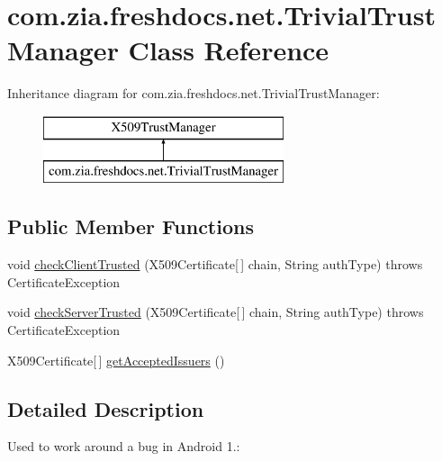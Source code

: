 \hypertarget{classcom_1_1zia_1_1freshdocs_1_1net_1_1_trivial_trust_manager}{\section{com.\-zia.\-freshdocs.\-net.\-Trivial\-Trust\-Manager Class Reference}
\label{classcom_1_1zia_1_1freshdocs_1_1net_1_1_trivial_trust_manager}
}
Inheritance diagram for com.\-zia.\-freshdocs.\-net.\-Trivial\-Trust\-Manager\-:\begin{figure}[H]
\begin{center}
\leavevmode
\includegraphics[height=2.000000cm]{classcom_1_1zia_1_1freshdocs_1_1net_1_1_trivial_trust_manager}
\end{center}
\end{figure}
\subsection*{Public Member Functions}
\begin{DoxyCompactItemize}
\item 
void \hyperlink{classcom_1_1zia_1_1freshdocs_1_1net_1_1_trivial_trust_manager_a2d78ff53750eb65a461cbd2ddb0da0dd}{check\-Client\-Trusted} (X509\-Certificate\mbox{[}$\,$\mbox{]} chain, String auth\-Type)  throws Certificate\-Exception 	
\item 
void \hyperlink{classcom_1_1zia_1_1freshdocs_1_1net_1_1_trivial_trust_manager_a88f33ea0e00166ea9398a362ea318eeb}{check\-Server\-Trusted} (X509\-Certificate\mbox{[}$\,$\mbox{]} chain, String auth\-Type)  throws Certificate\-Exception 	
\item 
X509\-Certificate\mbox{[}$\,$\mbox{]} \hyperlink{classcom_1_1zia_1_1freshdocs_1_1net_1_1_trivial_trust_manager_a594f46fd5203d453e07f97d2fb7767e4}{get\-Accepted\-Issuers} ()
\end{DoxyCompactItemize}


\subsection{Detailed Description}
Used to work around a bug in Android 1.\-:

